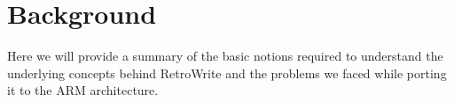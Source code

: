 \documentclass[a4paper,11pt,oneside]{report}
\newcommand{\sysname}{RetroWrite\xspace}
\begin{document}






\chapter{Background}

Here we will provide a summary of the basic notions required to understand the 
underlying concepts behind \sysname and the problems we faced while porting 
it to the ARM architecture. 
\end{document}

